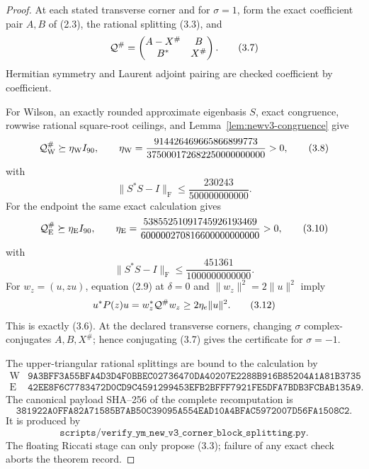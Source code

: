 \documentclass[11pt,oneside]{article}
\theoremstyle{definition}
\theoremstyle{remark}
\begin{document}
\begin{proof}
At each stated transverse corner and for \(\sigma=1\), form the exact
coefficient pair \(A,B\) of (2.3), the rational splitting (3.3), and
\[
 {\cal Q}^{\#}=
 \begin{pmatrix}A-X^\#&B\\B^*&X^\#\end{pmatrix}.          \tag{3.7}
\]
Hermitian symmetry and Laurent adjoint pairing are checked
coefficient by coefficient.

For Wilson, an exactly rounded approximate eigenbasis \(S\), exact
congruence, rowwise rational square-root ceilings, and
Lemma~\ref{lem:newv3-congruence} give
\[
 {\cal Q}^{\#}_{\mathrm W}\succeq
 \eta_{\mathrm W}I_{90},\qquad
 \eta_{\mathrm W}=
 \frac{914426469665866899773}
 {375000172682250000000000}>0,                            \tag{3.8}
\]
with
\[
 \|S^*S-I\|_{\mathrm F}\le
 \frac{230243}{500000000000}.                             \tag{3.9}
\]
For the endpoint the same exact calculation gives
\[
 {\cal Q}^{\#}_{\mathrm E}\succeq
 \eta_{\mathrm E}I_{90},\qquad
 \eta_{\mathrm E}=
 \frac{53855251091745926193469}
 {600000270816600000000000}>0,                            \tag{3.10}
\]
with
\[
 \|S^*S-I\|_{\mathrm F}\le
 \frac{451361}{1000000000000}.                            \tag{3.11}
\]
For \(w_z=(u,zu)\), equation (2.9) at \(\delta=0\) and
\(\|w_z\|^2=2\|u\|^2\) imply
\[
 u^*P(z)u=w_z^*{\cal Q}^{\#}w_z
 \ge2\eta_e\|u\|^2.                                      \tag{3.12}
\]
This is exactly (3.6).  At the declared transverse corners, changing
\(\sigma\) complex-conjugates \(A,B,X^\#\); hence conjugating (3.7)
gives the certificate for \(\sigma=-1\).

The upper-triangular rational splittings are bound to the calculation
by
\[
\begin{array}{c|c}
\mathrm W&
\texttt{9A3BFF3A55BFA4D3D4F0BBEC02736470DA40207E2288B916B85204A1A81B3735}\\
\mathrm E&
\texttt{42EE8F6C7783472D0CD9C4591299453EFB2BFFF7921FE5DFA7BDB3FCBAB135A9}.
\end{array}                                               \tag{3.13}
\]
The canonical payload SHA--256 of the complete recomputation is
\[
\texttt{381922A0FFA82A71585B7AB50C39095A554EAD10A4BFAC5972007D56FA1508C2}.
                                                               \tag{3.14}
\]
It is produced by
\[
\texttt{scripts/verify\_ym\_new\_v3\_corner\_block\_splitting.py}.
\]
The floating Riccati stage can only propose (3.3); failure of any
exact check aborts the theorem record.
\end{proof}
\end{document}
